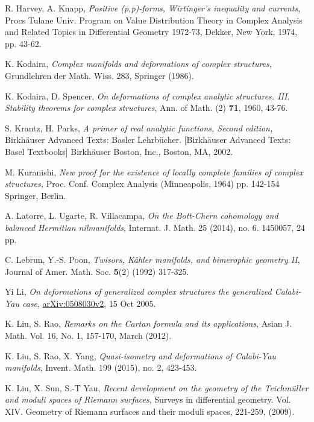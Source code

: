 \documentclass[12pt]{amsart}
\numberwithin{equation}{section}
\renewcommand{\1}{\mathds{1}}
\renewcommand{\>}{\rightarrow}
\begin{document}
\begin{thebibliography}{99}
 R. Harvey, A. Knapp,
\newblock \textit{Positive (p,p)-forms, Wirtinger's inequality and currents},
\newblock Procs Tulane Univ. Program on Value Distribution Theory in Complex Analysis and
Related Topics in Differential Geometry 1972-73, Dekker, New York,
1974, pp. 43-62.

 K. Kodaira,
\newblock \textit{Complex manifolds and deformations of complex
structures},
\newblock  Grundlehren der Math. Wiss. 283, Springer (1986).

 K. Kodaira, D. Spencer,
\newblock \textit{On deformations of complex analytic structures. III. Stability
theorems for complex structures},
\newblock Ann. of Math. (2) \textbf{71}, 1960, 43-76.

 S. Krantz, H. Parks,
\newblock \textit{A primer of real analytic functions, Second edition,}
 \newblock Birkh\"{a}user Advanced Texts: Basler Lehrb\"{u}cher.
 [Birkh\"{a}user Advanced Texts: Basel Textbooks] Birkh\"{a}user Boston, Inc., Boston, MA, 2002.

 M. Kuranishi,
\newblock \textit{New proof for the existence of locally complete families of complex structures,}
  Proc. Conf. Complex Analysis (Minneapolis, 1964) pp. 142-154 Springer, Berlin.

 A. Latorre, L. Ugarte, R. Villacampa,
\newblock \textit{On the Bott-Chern cohomology and balanced
Hermitian nilmanifolds},
\newblock Internat. J. Math. 25 (2014), no. 6. 1450057, 24 pp.

 C. Lebrun, Y.-S. Poon,
\newblock \textit{Twisors, K\"ahler manifolds, and bimerophic geometry II},
\newblock Journal of Amer. Math. Soc. \textbf{5}(2) (1992) 317-325.

 Yi Li,
\newblock \textit{On deformations of generalized complex structures the
generalized Calabi-Yau case},
\newblock \href{http://arxiv.org/abs/0508030v2}{arXiv:0508030v2}, 15 Oct 2005.

 K. Liu, S. Rao,
\newblock \textit{Remarks on the Cartan formula and its applications},
\newblock Asian J. Math. Vol. 16, No. 1, 157-170, March (2012).

 K. Liu, S. Rao, X. Yang,
\newblock\textit{Quasi-isometry and deformations of Calabi-Yau manifolds},
\newblock Invent. Math. 199 (2015), no. 2, 423-453.

 K. Liu, X. Sun, S.-T Yau,
\newblock \textit{Recent development on the geometry of
the Teichm\"{u}ller and moduli spaces of Riemann surfaces},
\newblock Surveys in differential geometry. Vol. XIV.
Geometry of Riemann surfaces and their moduli spaces, 221-259,
(2009).



\end{thebibliography}
\end{document}

